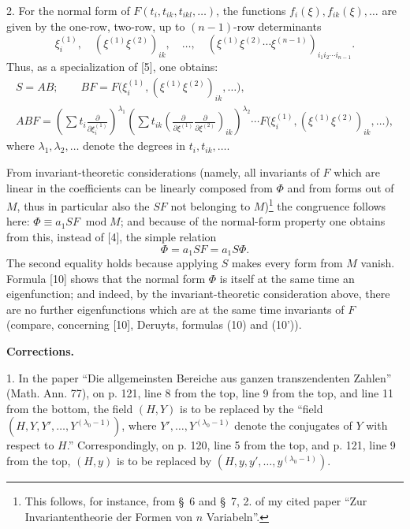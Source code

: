 \documentclass[11pt]{article}
\providecommand{\p}{\partial}
\providecommand{\modu}[1]{\;\operatorname{mod} #1}
\begin{document}
2. For the normal form of $F(t_i,t_{ik},t_{ikl},\ldots)$, the functions $f_i(\xi),f_{ik}(\xi),\ldots$ are given by the one-row, two-row, up to $(n-1)$-row determinants
\[
        \xi_i^{(1)},\quad (\xi^{(1)}\xi^{(2)})_{ik},\quad\ldots,\quad
        (\xi^{(1)}\xi^{(2)}\cdots\xi^{(n-1)})_{i_1i_2\cdots i_{n-1}}.
\]
Thus, as a specialization of [5], one obtains:
\[
\begin{gathered}
        S=AB;\qquad
        BF=F\bigl(\xi_i^{(1)},(\xi^{(1)}\xi^{(2)})_{ik},\ldots\bigr),\\
        ABF=\left(\sum t_i\frac{\p}{\p\xi_i^{(1)}}\right)^{\lambda_1}
        \left(\sum t_{ik}\left(\frac{\p}{\p\xi^{(1)}}\frac{\p}{\p\xi^{(2)}}\right)_{ik}\right)^{\lambda_2}
        \cdots F\bigl(\xi_i^{(1)},(\xi^{(1)}\xi^{(2)})_{ik},\ldots\bigr),
\end{gathered}
\]
where $\lambda_1,\lambda_2,\ldots$ denote the degrees in $t_i,t_{ik},\ldots$.

From invariant-theoretic considerations (namely, all invariants of $F$ which are linear in the coefficients can be linearly composed from $\Phi$ and from forms out of $M$, thus in particular also the $SF$ not belonging to $M$)\footnote{This follows, for instance, from \S~6 and \S~7, 2. of my cited paper ``Zur Invariantentheorie der Formen von $n$ Variabeln''.} the congruence follows here: $\Phi\equiv a_1SF\modu{M}$; and because of the normal-form property one obtains from this, instead of [4], the simple relation
\begin{equation}
        \Phi=a_1SF=a_1S\Phi.
\tag{10}
\end{equation}
The second equality holds because applying $S$ makes every form from $M$ vanish. Formula [10] shows that the normal form $\Phi$ is itself at the same time an eigenfunction; and indeed, by the invariant-theoretic consideration above, there are no further eigenfunctions which are at the same time invariants of $F$ (compare, concerning [10], Deruyts, formulas (10) and (10')).

\begin{center}
\textbf{Corrections.}
\end{center}

1. In the paper ``Die allgemeinsten Bereiche aus ganzen transzendenten Zahlen'' (Math. Ann. 77), on p. 121, line 8 from the top, line 9 from the top, and line 11 from the bottom, the field $(H,Y)$ is to be replaced by the ``field $(H,Y,Y',\ldots,Y^{(\lambda_0-1)})$, where $Y',\ldots,Y^{(\lambda_0-1)}$ denote the conjugates of $Y$ with respect to $H$.'' Correspondingly, on p. 120, line 5 from the top, and p. 121, line 9 from the top, $(H,y)$ is to be replaced by $(H,y,y',\ldots,y^{(\lambda_0-1)})$.
\end{document}
